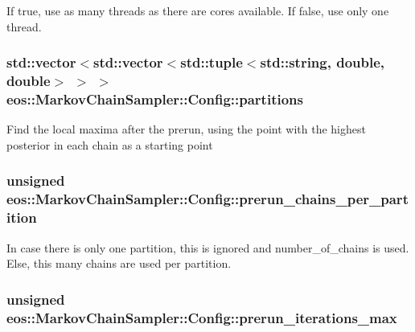 \label{classeos_1_1MarkovChainSampler_1_1Config_ad66eb9a48dd6aa736cf476322ed5b13e}
If true, use as many threads as there are cores available. If false, use only one thread. \hypertarget{classeos_1_1MarkovChainSampler_1_1Config_a86b460f2153f55c4d5763f50f5bdba95}{
\subsubsection[{partitions}]{\setlength{\rightskip}{0pt plus 5cm}std::vector$<$std::vector$<$std::tuple$<$std::string, double, double$>$ $>$ $>$ {\bf eos::MarkovChainSampler::Config::partitions}}}
\label{classeos_1_1MarkovChainSampler_1_1Config_a86b460f2153f55c4d5763f50f5bdba95}
Find the local maxima after the prerun, using the point with the highest posterior in each chain as a starting point \hypertarget{classeos_1_1MarkovChainSampler_1_1Config_a4b8b7f5ca38ffd97f0cbb431237a2872}{
\subsubsection[{prerun\_\-chains\_\-per\_\-partition}]{\setlength{\rightskip}{0pt plus 5cm}unsigned {\bf eos::MarkovChainSampler::Config::prerun\_\-chains\_\-per\_\-partition}}}
\label{classeos_1_1MarkovChainSampler_1_1Config_a4b8b7f5ca38ffd97f0cbb431237a2872}
In case there is only one partition, this is ignored and number\_\-of\_\-chains is used. Else, this many chains are used per partition. \hypertarget{classeos_1_1MarkovChainSampler_1_1Config_aed5faf2c2cd03d33d5acb79fc16132a4}{
\subsubsection[{prerun\_\-iterations\_\-max}]{\setlength{\rightskip}{0pt plus 5cm}unsigned {\bf eos::MarkovChainSampler::Config::prerun\_\-iterations\_\-max}}}
